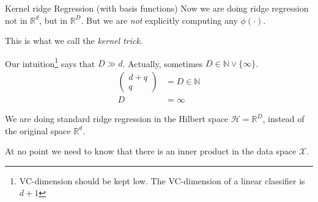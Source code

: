 \begin{example}[breakable]{Kernel ridge Regression (with basis functions)}{}
	Now we are doing ridge regression not in $\mathds R^d$, but in
	$\mathds R^D$. But we are \emph{not} explicitly computing
	any $\phi(\cdot)$.

  This is what we call the \emph{kernel trick}.

	Our intuition\footnote{VC-dimension should be kept low.
		The VC-dimension of a linear classifier is $d+1$
	}
	says that $D \gg d$. Actually, sometimes
	$D \in \mathds N \vee \{\infty\}$.
	\begin{align*}
		\begin{pmatrix}
			d + q \\
			q
		\end{pmatrix} & = D \in \mathds N \tag{Polynomial kernel} \\
		D               & = \infty \tag{RBF kernel}
	\end{align*}

	We are doing standard ridge regression in the Hilbert space
	$\mathcal H = \mathds R^D$, instead of the original space $\mathds R^d$.

	\begin{note}
		At no point we need to know that there is an inner product in the
		data space $\mathcal X$.
	\end{note}
\end{example}


